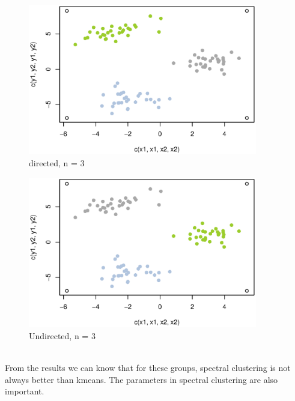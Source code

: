 {\begin{figure}[htbp]
\end{figure}
\begin{figure}[htbp]
\centering
{}\hfill
{}\hfill
{}	
\end{figure}
\begin{figure}[htbp]
\centering
\includegraphics[width = 10cm]{pics/hw2_2_data3_directed_3.eps}
\caption{directed, n = 3}
\end{figure}
\begin{figure}[htbp]
\centering
\includegraphics[width = 10cm]{pics/hw2_2_data3_undirected_3.eps}
\caption{Undirected, n = 3}
\end{figure} \\
From the results we can know that for these groups, spectral clustering is not always better than kmeans. The parameters in spectral clustering are also important.
}
